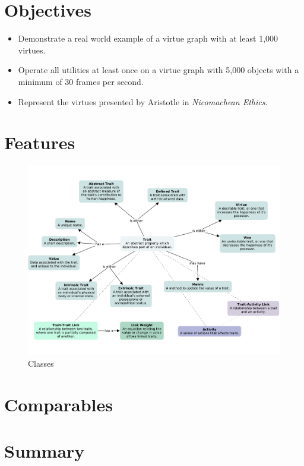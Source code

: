 \documentclass{article}
\begin{document}
\section{Objectives}

\begin{itemize}
    \item Demonstrate a real world example of a virtue graph with at least 1,000 virtues.
    \item Operate all utilities at least once on a virtue graph with 5,000 objects with a minimum of 30 frames per second.
    \item Represent the virtues presented by Aristotle in \textit{Nicomachean Ethics}.
\end{itemize}

\section{Features}

\begin{figure}[h]
    \includegraphics[width=\linewidth]{classes.pdf}
    \caption{Classes}
    \label{fig:classes}
\end{figure}

\section{Comparables}


\section{Summary}

\end{document}
